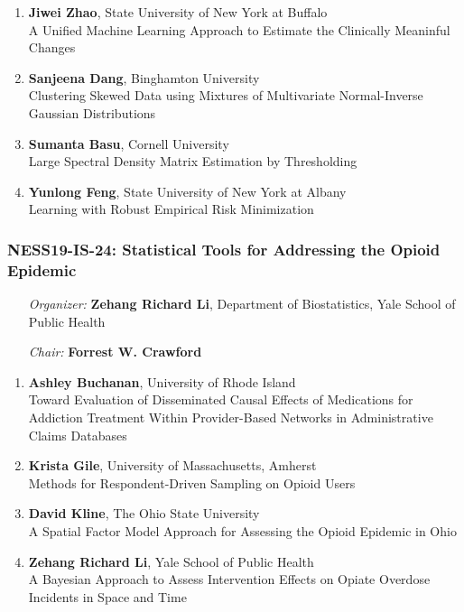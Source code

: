 \begin{enumerate}
\item \textbf{Jiwei Zhao}, State University of New York at Buffalo \\
A Unified Machine Learning Approach to Estimate the Clinically Meaninful Changes
\item \textbf{Sanjeena Dang}, Binghamton University \\
Clustering Skewed Data using Mixtures of Multivariate Normal-Inverse Gaussian Distributions
\item \textbf{Sumanta Basu}, Cornell University \\
Large Spectral Density Matrix Estimation by Thresholding
\item \textbf{Yunlong Feng}, State University of New York at Albany \\
Learning with Robust Empirical Risk Minimization
\end{enumerate}

\subsubsection*{NESS19-IS-24: Statistical Tools for Addressing the Opioid Epidemic}

\begin{enumerate}[align=left]
\item [\emph{Organizer:}] \textbf{Zehang Richard Li}, Department of Biostatistics, Yale School of Public Health \\
\item [\emph{Chair:}] \textbf{Forrest W. Crawford}
\end{enumerate}

\begin{enumerate}
\item \textbf{Ashley Buchanan}, University of Rhode Island \\
Toward Evaluation of Disseminated Causal Effects of Medications for Addiction Treatment Within Provider-Based Networks in Administrative Claims Databases
\item \textbf{Krista Gile}, University of Massachusetts, Amherst \\
Methods for Respondent-Driven Sampling on Opioid Users
\item \textbf{David Kline}, The Ohio State University \\
A Spatial Factor Model Approach for Assessing the Opioid Epidemic in Ohio
\item \textbf{Zehang Richard Li}, Yale School of Public Health \\
A Bayesian Approach to Assess Intervention Effects on Opiate Overdose Incidents in Space and Time
\end{enumerate}

